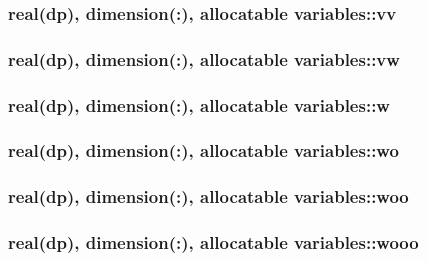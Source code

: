 \hypertarget{classvariables_aef6fef20c791c27c3df889f2c9f02b3b}{
\subsubsection[{vv}]{\setlength{\rightskip}{0pt plus 5cm}real(dp), dimension(\-:), allocatable variables\-::vv}}\label{classvariables_aef6fef20c791c27c3df889f2c9f02b3b}
\hypertarget{classvariables_a131da6ae59433fe4b51bb9a849f82f4c}{
\subsubsection[{vw}]{\setlength{\rightskip}{0pt plus 5cm}real(dp), dimension(\-:), allocatable variables\-::vw}}\label{classvariables_a131da6ae59433fe4b51bb9a849f82f4c}
\hypertarget{classvariables_a3432b41828f50801593af70692df12f2}{
\subsubsection[{w}]{\setlength{\rightskip}{0pt plus 5cm}real(dp), dimension(\-:), allocatable variables\-::w}}\label{classvariables_a3432b41828f50801593af70692df12f2}
\hypertarget{classvariables_a70b466d97bf23be72e5bce7f20689933}{
\subsubsection[{wo}]{\setlength{\rightskip}{0pt plus 5cm}real(dp), dimension(\-:), allocatable variables\-::wo}}\label{classvariables_a70b466d97bf23be72e5bce7f20689933}
\hypertarget{classvariables_adca212df59d44fece82e4874774071ec}{
\subsubsection[{woo}]{\setlength{\rightskip}{0pt plus 5cm}real(dp), dimension(\-:), allocatable variables\-::woo}}\label{classvariables_adca212df59d44fece82e4874774071ec}
\hypertarget{classvariables_aebc14f0f9203bb1e65503d86138e709f}{
\subsubsection[{wooo}]{\setlength{\rightskip}{0pt plus 5cm}real(dp), dimension(\-:), allocatable variables\-::wooo}}\label{classvariables_aebc14f0f9203bb1e65503d86138e709f}

